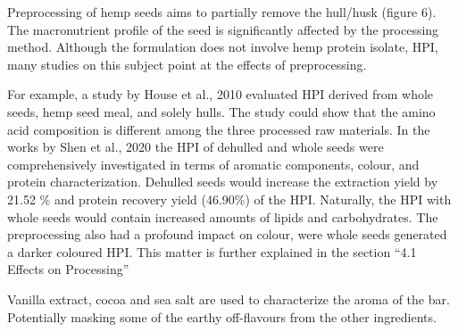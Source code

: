 \vspace{1em}
Preprocessing of hemp seeds aims to partially remove the hull/husk (figure 6). The macronutrient profile of the seed is significantly affected by the processing method. Although the formulation does not involve hemp protein isolate, HPI, many studies on this subject point at the effects of preprocessing. 

\vspace{1em}
For example, a study by House et al., 2010 evaluated HPI derived from whole seeds, hemp seed meal, and solely hulls. The study could show that the amino acid composition is different among the three processed raw materials. In the works by Shen et al., 2020 the HPI of dehulled and whole seeds were comprehensively investigated in terms of aromatic components, colour, and protein characterization. Dehulled seeds would increase the extraction yield by 21.52 \% and protein recovery yield (46.90\%) of the HPI. Naturally, the HPI with whole seeds would contain increased amounts of lipids and carbohydrates. The preprocessing also had a profound impact on colour, were whole seeds generated a darker coloured HPI. This matter is further explained in the section “4.1 Effects on Processing”

\vspace{1em}
Vanilla extract, cocoa and sea salt are used to characterize the aroma of the bar. Potentially masking some of the earthy off-flavours from the other ingredients. 


